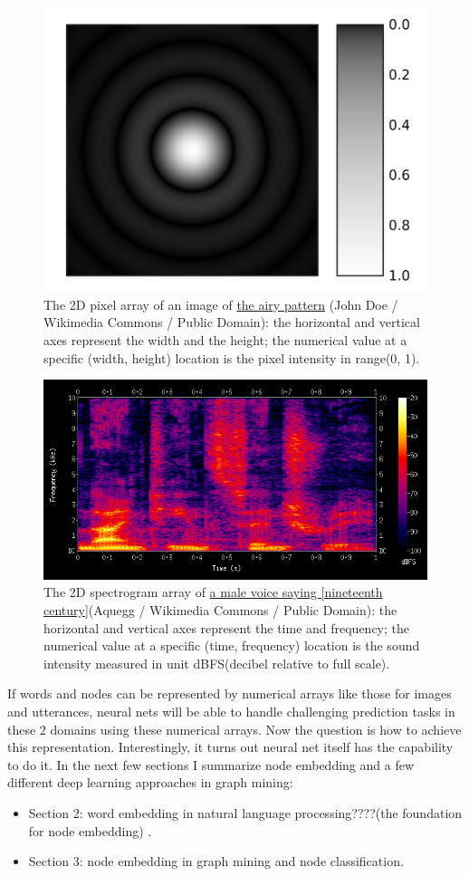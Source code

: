 \documentclass{article}
\begin{document}
\begin{figure}[h]
	\centering
	\includegraphics[width=0.5\linewidth]{Airy-pattern}
	\caption{The 2D pixel array of an image of  \href{https://commons.wikimedia.org/wiki/File:Airy-pattern.svg}{the airy pattern} (John Doe / Wikimedia Commons / Public Domain): the horizontal and vertical axes represent the width and the height; the numerical value at a specific (width, height) location is the pixel intensity in range(0, 1).}
	\label{fig:Airy-pattern}
\end{figure}

\begin{figure}[h]
	\centering
	\includegraphics[width=\linewidth]{Spectrogram-19thC}
	\caption{The 2D spectrogram array of \href{https://commons.wikimedia.org/wiki/File:Spectrogram-19thC.png}{a male voice saying [nineteenth century]}(Aquegg / Wikimedia Commons / Public Domain): the horizontal and vertical axes represent the time and frequency; the numerical value at a specific (time, frequency) location is the sound intensity measured in unit dBFS(decibel relative to full scale).}
	\label{fig:Spectrogram-19thC}
\end{figure}

If words and nodes can be represented by numerical arrays like those for images and utterances, neural nets will be able to handle challenging prediction tasks in these 2 domains using these numerical arrays. Now the question is how to achieve this representation. Interestingly, it turns out neural net itself has the capability to do it. In the next few sections I summarize node embedding and a few different deep learning approaches in graph mining:
\begin{itemize}
	\item Section 2: word embedding in natural language processing????(the foundation for node embedding) .
	\item Section 3: node embedding in graph mining and node classification.
\end{itemize}
\end{document}
